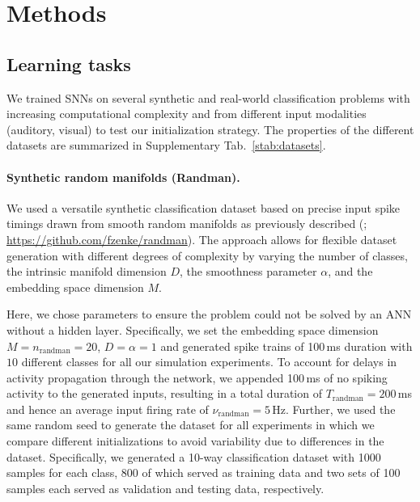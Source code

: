 \documentclass[11pt,a4paper]{article}
\begin{document}
\section*{Methods}

\subsection*{Learning tasks}

We trained \acp{SNN} on several synthetic and real-world
classification problems with increasing computational complexity and from different input modalities (auditory, visual) to test our initialization strategy. The properties of the different datasets are summarized in Supplementary Tab.~\ref{stab:datasets}.

\paragraph{Synthetic random manifolds (Randman).} 
We used a versatile synthetic classification dataset based on precise input spike timings drawn from smooth 
random manifolds as previously described (\citealp{Zenke2021-zg};  \href{https://github.com/fzenke/randman}{https://github.com/fzenke/randman}). 
The approach allows for flexible dataset generation with different degrees of complexity by varying the number of classes, the intrinsic manifold dimension $D$, the smoothness parameter $\alpha$, and the embedding space dimension $M$. 

Here, we chose parameters to ensure the problem could not be solved by an \ac{ANN} without a hidden layer. 
Specifically, we set the embedding space dimension $M = n_{\mathrm{randman}} = 20$, \mbox{$D=\alpha=1$} and generated spike trains of 100\,ms duration with $10$ different classes for all our simulation experiments. 
To account for delays in activity propagation through the network, we appended 100\,ms of no spiking activity to the generated inputs, resulting in a total duration of $T_{\mathrm{randman}}=200$\,ms and hence an average input firing rate of $\nu_{\mathrm{randman}}=5$\,Hz. Further, we used the same random seed to generate the dataset for all experiments in which we compare different initializations to avoid variability due to differences in the dataset. 
Specifically, we generated a 10-way classification dataset with 1000 samples for each class, 800 of which served as training data and two sets of 100 samples each served as validation and testing data, respectively.
\end{document}
